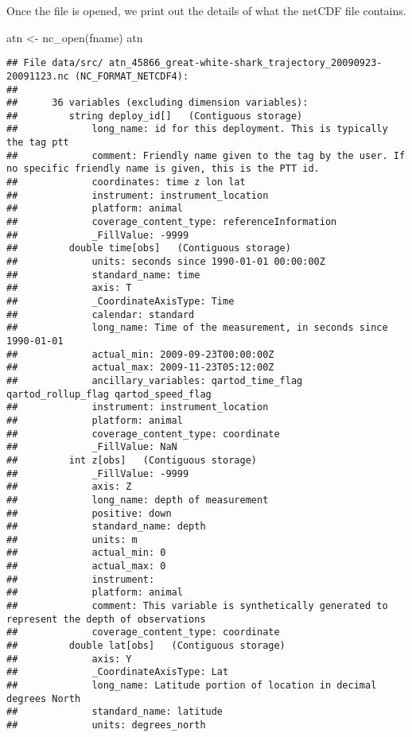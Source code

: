 \documentclass[
]{book}
\newenvironment{Shaded}{\begin{snugshade}}{\end{snugshade}}
\newcommand{\FunctionTok}[1]{\textcolor[rgb]{0.00,0.00,0.00}{#1}}
\newcommand{\NormalTok}[1]{#1}
\newcommand{\OtherTok}[1]{\textcolor[rgb]{0.56,0.35,0.01}{#1}}
\begin{document}
Once the file is opened, we print out the details of what the netCDF file contains.

\begin{Shaded}
\begin{Highlighting}[]
\NormalTok{atn }\OtherTok{\textless{}{-}} \FunctionTok{nc\_open}\NormalTok{(fname)}
\NormalTok{atn}
\end{Highlighting}
\end{Shaded}

\begin{verbatim}
## File data/src/ atn_45866_great-white-shark_trajectory_20090923-20091123.nc (NC_FORMAT_NETCDF4):
## 
##      36 variables (excluding dimension variables):
##         string deploy_id[]   (Contiguous storage)  
##             long_name: id for this deployment. This is typically the tag ptt
##             comment: Friendly name given to the tag by the user. If no specific friendly name is given, this is the PTT id.
##             coordinates: time z lon lat
##             instrument: instrument_location
##             platform: animal
##             coverage_content_type: referenceInformation
##             _FillValue: -9999
##         double time[obs]   (Contiguous storage)  
##             units: seconds since 1990-01-01 00:00:00Z
##             standard_name: time
##             axis: T
##             _CoordinateAxisType: Time
##             calendar: standard
##             long_name: Time of the measurement, in seconds since 1990-01-01
##             actual_min: 2009-09-23T00:00:00Z
##             actual_max: 2009-11-23T05:12:00Z
##             ancillary_variables: qartod_time_flag qartod_rollup_flag qartod_speed_flag
##             instrument: instrument_location
##             platform: animal
##             coverage_content_type: coordinate
##             _FillValue: NaN
##         int z[obs]   (Contiguous storage)  
##             _FillValue: -9999
##             axis: Z
##             long_name: depth of measurement
##             positive: down
##             standard_name: depth
##             units: m
##             actual_min: 0
##             actual_max: 0
##             instrument: 
##             platform: animal
##             comment: This variable is synthetically generated to represent the depth of observations
##             coverage_content_type: coordinate
##         double lat[obs]   (Contiguous storage)  
##             axis: Y
##             _CoordinateAxisType: Lat
##             long_name: Latitude portion of location in decimal degrees North
##             standard_name: latitude
##             units: degrees_north

\end{verbatim}
\end{document}
